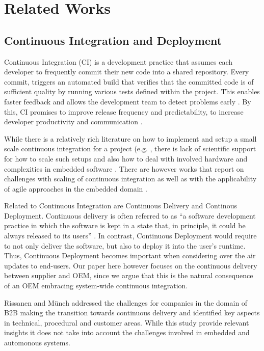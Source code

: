 \section{Related Works}\label{sec:relatedWorks}

\subsection{Continuous Integration and Deployment}

Continuous Integration (CI) is a development practice that assumes each developer to frequently commit their new code into a shared repository.
Every commit, triggers an automated build that verifies that the committed code is of sufficient quality by running various tests defined within the project. This enables faster feedback and allows the development team to detect problems early \cite{Fowler2006}.
By this, CI promises to improve release frequency and predictability, to increase developer productivity and communication \cite{Stahl2014}. 

While there is a relatively rich literature on how to implement and setup a small scale continuous integration for a project (e.g. \cite{Fowler2006,Neely2013}, there is lack of scientific support for how to scale such setups and also how to deal with involved hardware and complexities in embedded software \cite{Debbiche2014}. There are however works that report on challenges with scaling of continuous integration \cite{Roberts2004,Rogers2004} as well as with the applicability of agile approaches in the embedded domain \cite{Eklund2012}.

Related to Continuous Integration are Continuous Delivery and Continous Deployment.
Continuous delivery is often referred to as ``a software development practice in which the software is kept in a state that, in principle, it could be always released to its users'' \cite{Humble2010}. 
In contrast, Continuous Deployment would require to not only deliver the software, but also to deploy it into the user's runtime.
Thus, Continuous Deployment becomes important when considering over the air updates to end-users.
Our paper here however focuses on the continuous delivery between supplier and OEM, since we argue that this is the natural consequence of an OEM embracing system-wide continuous integration.

Rissanen and M\"unch \cite{Rissanen2015} addressed the challenges for companies in the domain of B2B making the transition towards continuous delivery and identified key aspects in technical, procedural and customer areas. While this study provide relevant insights it does not take into account the challenges involved in embedded and automonous systems. 


